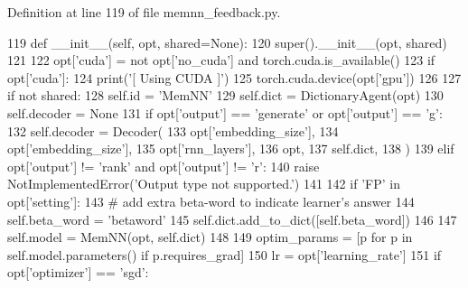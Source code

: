 Definition at line 119 of file memnn\+\_\+feedback.\+py.


\begin{DoxyCode}
119     \textcolor{keyword}{def }\_\_init\_\_(self, opt, shared=None):
120         super().\_\_init\_\_(opt, shared)
121 
122         opt[\textcolor{stringliteral}{'cuda'}] = \textcolor{keywordflow}{not} opt[\textcolor{stringliteral}{'no\_cuda'}] \textcolor{keywordflow}{and} torch.cuda.is\_available()
123         \textcolor{keywordflow}{if} opt[\textcolor{stringliteral}{'cuda'}]:
124             print(\textcolor{stringliteral}{'[ Using CUDA ]'})
125             torch.cuda.device(opt[\textcolor{stringliteral}{'gpu'}])
126 
127         \textcolor{keywordflow}{if} \textcolor{keywordflow}{not} shared:
128             self.id = \textcolor{stringliteral}{'MemNN'}
129             self.dict = DictionaryAgent(opt)
130             self.decoder = \textcolor{keywordtype}{None}
131             \textcolor{keywordflow}{if} opt[\textcolor{stringliteral}{'output'}] == \textcolor{stringliteral}{'generate'} \textcolor{keywordflow}{or} opt[\textcolor{stringliteral}{'output'}] == \textcolor{stringliteral}{'g'}:
132                 self.decoder = Decoder(
133                     opt[\textcolor{stringliteral}{'embedding\_size'}],
134                     opt[\textcolor{stringliteral}{'embedding\_size'}],
135                     opt[\textcolor{stringliteral}{'rnn\_layers'}],
136                     opt,
137                     self.dict,
138                 )
139             \textcolor{keywordflow}{elif} opt[\textcolor{stringliteral}{'output'}] != \textcolor{stringliteral}{'rank'} \textcolor{keywordflow}{and} opt[\textcolor{stringliteral}{'output'}] != \textcolor{stringliteral}{'r':}
140 \textcolor{stringliteral}{                }\textcolor{keywordflow}{raise} NotImplementedError(\textcolor{stringliteral}{'Output type not supported.'})
141 
142             \textcolor{keywordflow}{if} \textcolor{stringliteral}{'FP'} \textcolor{keywordflow}{in} opt[\textcolor{stringliteral}{'setting'}]:
143                 \textcolor{comment}{# add extra beta-word to indicate learner's answer}
144                 self.beta\_word = \textcolor{stringliteral}{'betaword'}
145                 self.dict.add\_to\_dict([self.beta\_word])
146 
147             self.model = MemNN(opt, self.dict)
148 
149             optim\_params = [p \textcolor{keywordflow}{for} p \textcolor{keywordflow}{in} self.model.parameters() \textcolor{keywordflow}{if} p.requires\_grad]
150             lr = opt[\textcolor{stringliteral}{'learning\_rate'}]
151             \textcolor{keywordflow}{if} opt[\textcolor{stringliteral}{'optimizer'}] == \textcolor{stringliteral}{'sgd'}:

\end{DoxyCode}
